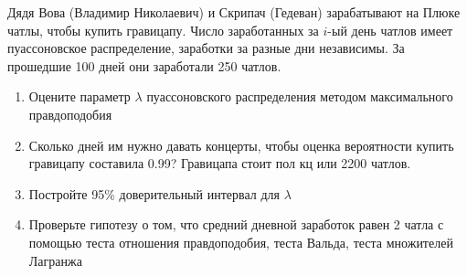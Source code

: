 \documentclass[pdftex,11pt,openany]{book}\usepackage[]{graphicx}\usepackage[]{color}
\begin{document}
\begin{problem}
Дядя Вова (Владимир Николаевич) и Скрипач (Гедеван) зарабатывают на Плюке чатлы, чтобы купить гравицапу. Число заработанных за $i$-ый день чатлов имеет пуассоновское распределение, заработки за разные дни независимы. За прошедшие 100 дней они заработали 250 чатлов.
\begin{enumerate}
\item Оцените параметр $\lambda$ пуассоновского распределения методом максимального правдоподобия
\item Сколько дней им нужно давать концерты, чтобы оценка вероятности купить гравицапу составила 0.99? Гравицапа стоит пол кц или 2200 чатлов.
\item Постройте 95\% доверительный интервал для $\lambda$
\item Проверьте гипотезу о том, что средний дневной заработок равен 2 чатла с помощью теста отношения правдоподобия, теста Вальда, теста множителей Лагранжа
\end{enumerate}
\end{problem}
\end{document}
